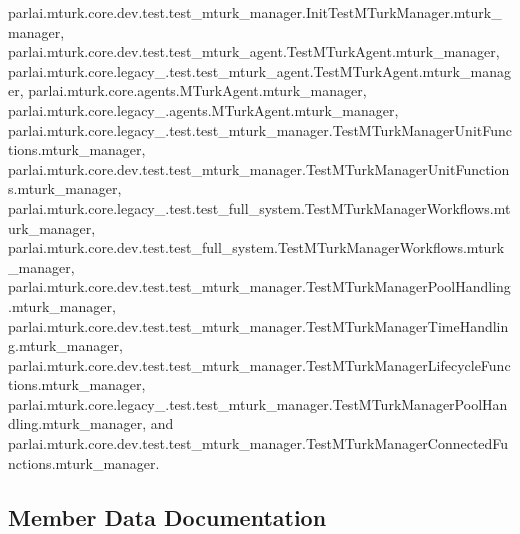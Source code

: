parlai.\+mturk.\+core.\+dev.\+test.\+test\+\_\+mturk\+\_\+manager.\+Init\+Test\+M\+Turk\+Manager.\+mturk\+\_\+manager, parlai.\+mturk.\+core.\+dev.\+test.\+test\+\_\+mturk\+\_\+agent.\+Test\+M\+Turk\+Agent.\+mturk\+\_\+manager, parlai.\+mturk.\+core.\+legacy\+\_.\+test.\+test\+\_\+mturk\+\_\+agent.\+Test\+M\+Turk\+Agent.\+mturk\+\_\+manager, parlai.\+mturk.\+core.\+agents.\+M\+Turk\+Agent.\+mturk\+\_\+manager, parlai.\+mturk.\+core.\+legacy\+\_.\+agents.\+M\+Turk\+Agent.\+mturk\+\_\+manager, parlai.\+mturk.\+core.\+legacy\+\_.\+test.\+test\+\_\+mturk\+\_\+manager.\+Test\+M\+Turk\+Manager\+Unit\+Functions.\+mturk\+\_\+manager, parlai.\+mturk.\+core.\+dev.\+test.\+test\+\_\+mturk\+\_\+manager.\+Test\+M\+Turk\+Manager\+Unit\+Functions.\+mturk\+\_\+manager, parlai.\+mturk.\+core.\+legacy\+\_.\+test.\+test\+\_\+full\+\_\+system.\+Test\+M\+Turk\+Manager\+Workflows.\+mturk\+\_\+manager, parlai.\+mturk.\+core.\+dev.\+test.\+test\+\_\+full\+\_\+system.\+Test\+M\+Turk\+Manager\+Workflows.\+mturk\+\_\+manager, parlai.\+mturk.\+core.\+dev.\+test.\+test\+\_\+mturk\+\_\+manager.\+Test\+M\+Turk\+Manager\+Pool\+Handling.\+mturk\+\_\+manager, parlai.\+mturk.\+core.\+dev.\+test.\+test\+\_\+mturk\+\_\+manager.\+Test\+M\+Turk\+Manager\+Time\+Handling.\+mturk\+\_\+manager, parlai.\+mturk.\+core.\+dev.\+test.\+test\+\_\+mturk\+\_\+manager.\+Test\+M\+Turk\+Manager\+Lifecycle\+Functions.\+mturk\+\_\+manager, parlai.\+mturk.\+core.\+legacy\+\_.\+test.\+test\+\_\+mturk\+\_\+manager.\+Test\+M\+Turk\+Manager\+Pool\+Handling.\+mturk\+\_\+manager, and parlai.\+mturk.\+core.\+dev.\+test.\+test\+\_\+mturk\+\_\+manager.\+Test\+M\+Turk\+Manager\+Connected\+Functions.\+mturk\+\_\+manager.



\subsection{Member Data Documentation}
\mbox{\label{classparlai_1_1mturk_1_1core_1_1legacy__2018_1_1test_1_1test__mturk__manager_1_1TestMTurkManagerPoolHandling_a9687ff918de01e0c3cbf9d913e73cecd}} 

